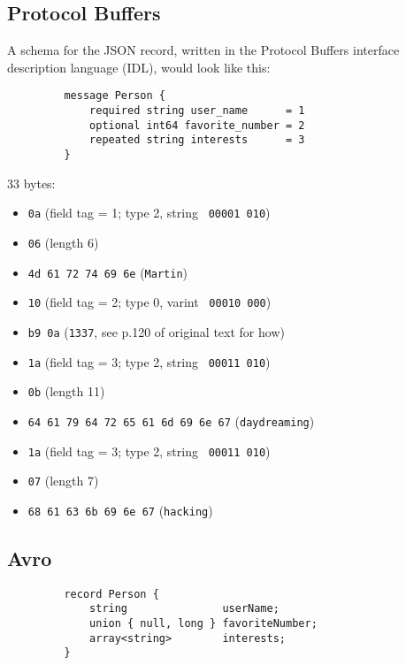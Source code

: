 \documentclass[12pt, titlepage]{article}
\begin{document}
\subsection{Protocol Buffers}

A schema for the JSON record, written in the Protocol Buffers interface description language (IDL), would look like this:

\begin{verbatim}
         message Person {
             required string user_name      = 1
             optional int64 favorite_number = 2
             repeated string interests      = 3
         }
\end{verbatim}

33 bytes:

\begin{itemize}
    \item \texttt{0a} (field tag = 1; type 2, string \textrightarrow\ \texttt{00001 010})
    \item \texttt{06} (length 6)
    \item \texttt{4d 61 72 74 69 6e} (\texttt{Martin})
    \item \texttt{10} (field tag = 2; type 0, varint \textrightarrow\ \texttt{00010 000})
    \item \texttt{b9 0a} (\texttt{1337}, see p.120 of original text for how)
    \item \texttt{1a} (field tag = 3; type 2, string \textrightarrow\ \texttt{00011 010})
    \item \texttt{0b} (length 11)
    \item \texttt{64 61 79 64 72 65 61 6d 69 6e 67} (\texttt{daydreaming})
    \item \texttt{1a} (field tag = 3; type 2, string \textrightarrow\ \texttt{00011 010})
    \item \texttt{07} (length 7)
    \item \texttt{68 61 63 6b 69 6e 67} (\texttt{hacking})
\end{itemize}

\subsection{Avro}

\begin{verbatim}
         record Person {
             string               userName;
             union { null, long } favoriteNumber;
             array<string>        interests;
         }
\end{verbatim}
\end{document}
